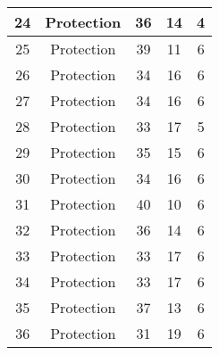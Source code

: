 \documentclass[results.tex]{subfiles}
\begin{document}
\begin{center}
\begin{tabular}{| c || c | c | c | c |}
            \hline
            24                      & Protection                   & 36                     & 14                      & 4                    \\
            \hline
            25                      & Protection                   & 39                     & 11                      & 6                    \\
            \hline
            26                      & Protection                   & 34                     & 16                      & 6                    \\
            \hline
            27                      & Protection                   & 34                     & 16                      & 6                    \\
            \hline
            28                      & Protection                   & 33                     & 17                      & 5                    \\
            \hline
            29                      & Protection                   & 35                     & 15                      & 6                    \\
            \hline
            30                      & Protection                   & 34                     & 16                      & 6                    \\
            \hline
            31                      & Protection                   & 40                     & 10                      & 6                    \\
            \hline
            32                      & Protection                   & 36                     & 14                      & 6                    \\
            \hline
            33                      & Protection                   & 33                     & 17                      & 6                    \\
            \hline
            34                      & Protection                   & 33                     & 17                      & 6                    \\
            \hline
            35                      & Protection                   & 37                     & 13                      & 6                    \\
            \hline
            36                      & Protection                   & 31                     & 19                      & 6                    \\

\end{tabular}
\end{center}
\end{document}
